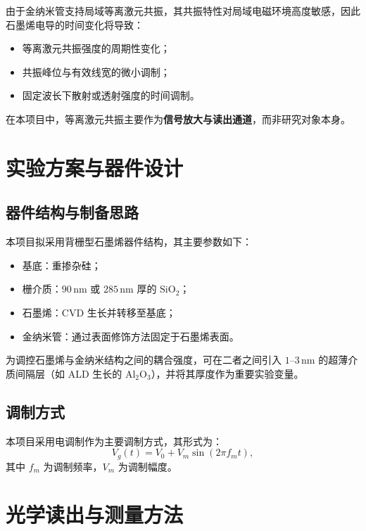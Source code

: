 \documentclass[12pt,a4paper]{article}
\begin{document}
由于金纳米管支持局域等离激元共振，其共振特性对局域电磁环境高度敏感，因此石墨烯电导的时间变化将导致：

\begin{itemize}
  \item 等离激元共振强度的周期性变化；
  \item 共振峰位与有效线宽的微小调制；
  \item 固定波长下散射或透射强度的时间调制。
\end{itemize}

在本项目中，等离激元共振主要作为\textbf{信号放大与读出通道}，而非研究对象本身。

\section{实验方案与器件设计}

\subsection{器件结构与制备思路}

本项目拟采用背栅型石墨烯器件结构，其主要参数如下：

\begin{itemize}
  \item 基底：重掺杂硅；
  \item 栅介质：$90\,\mathrm{nm}$ 或 $285\,\mathrm{nm}$ 厚的 $\mathrm{SiO_2}$；
  \item 石墨烯：CVD 生长并转移至基底；
  \item 金纳米管：通过表面修饰方法固定于石墨烯表面。
\end{itemize}

为调控石墨烯与金纳米结构之间的耦合强度，可在二者之间引入 $1$--$3\,\mathrm{nm}$ 的超薄介质间隔层（如 ALD 生长的 $\mathrm{Al_2O_3}$），并将其厚度作为重要实验变量。

\subsection{调制方式}

本项目采用电调制作为主要调制方式，其形式为：
\begin{equation}
V_g(t) = V_0 + V_m \sin(2\pi f_m t),
\end{equation}
其中 $f_m$ 为调制频率，$V_m$ 为调制幅度。

\section{光学读出与测量方法}
\end{document}
